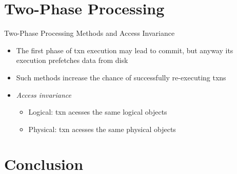 \documentclass[sans]{beamer}
\begin{document}
\section{Two-Phase Processing}

\begin{frame}{Two-Phase Processing Methods and Access Invariance}
  \begin{itemize}
    \item The first phase of txn execution may lead to commit,
      but anyway its execution prefetches data from disk 
    \item Such methods increase the chance of successfully re-executing
      txns
    \item \emph{Access invariance}
      \begin{itemize}
        \item Logical: txn acesses the same logical objects
        \item Physical: txn acesses the same physical objects
      \end{itemize}
  \end{itemize}
\end{frame}

\section{Conclusion}
\end{document}
